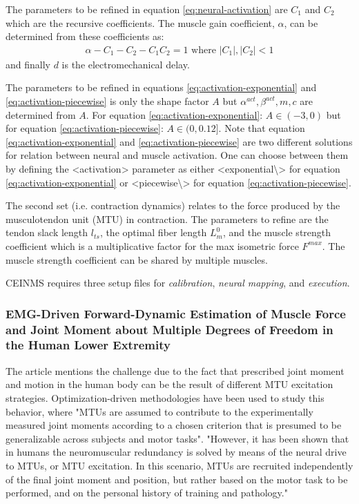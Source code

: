 The parameters to be refined in equation \ref{eq:neural-activation} are $C_1$ and $C_2$ which are the recursive coefficients. The muscle gain coefficient, $\alpha$, can be determined from these coefficients as:
\begin{align}
\label{eq:muscle-gain-coeff}
    \alpha - C_1 - C_2 - C_1 C_2 = 1 \text{ where } \left|C_1\right|,\left|C_2\right| < 1
\end{align}
and finally $d$ is the electromechanical delay.

The parameters to be refined in equations \ref{eq:activation-exponential} and \ref{eq:activation-piecewise} is only the shape factor $A$ but $\alpha^{act}, \beta^{act}, m, c$ are determined from $A$. 
For equation \ref{eq:activation-exponential}: $A\in (-3, 0)$ but for equation \ref{eq:activation-piecewise}: $A\in (0, 0.12]$. 
Note that equation \ref{eq:activation-exponential} and \ref{eq:activation-piecewise} are two different solutions for relation between neural and muscle activation. 
One can choose between them by defining the <activation> parameter as either <exponential\textbackslash{}> for equation \ref{eq:activation-exponential} or <piecewise\textbackslash{}> for equation \ref{eq:activation-piecewise}.

The second set (i.e. contraction dynamics) relates to the force produced by the musculotendon unit (MTU) in contraction. The parameters to refine are the tendon slack length $l_{ts}$, the optimal fiber length $L_m^0$, and the muscle strength coefficient which is a multiplicative factor for the max isometric force $F^{max}$. The muscle strength coefficient can be shared by multiple muscles. 

CEINMS requires three setup files for \textit{calibration}, \textit{neural mapping}, and \textit{execution}.

\subsubsection{EMG-Driven Forward-Dynamic Estimation of Muscle Force and Joint Moment about Multiple Degrees of Freedom in the Human Lower Extremity}

The article mentions the challenge due to the fact that prescribed joint moment and motion in the human body can be the result of different MTU excitation strategies. 
Optimization-driven methodologies have been used to study this behavior, where "MTUs are assumed to contribute to the experimentally measured joint moments according to a chosen criterion that is presumed to be generalizable across subjects and motor tasks". 
"However, it has been shown that in humans the neuromuscular redundancy is solved by means of the neural drive to MTUs, or MTU excitation. In this scenario, MTUs are recruited independently of the final joint moment and position, but rather based on the motor task to be performed, and on the personal history of training and pathology." \cite{Sartori2012a}

